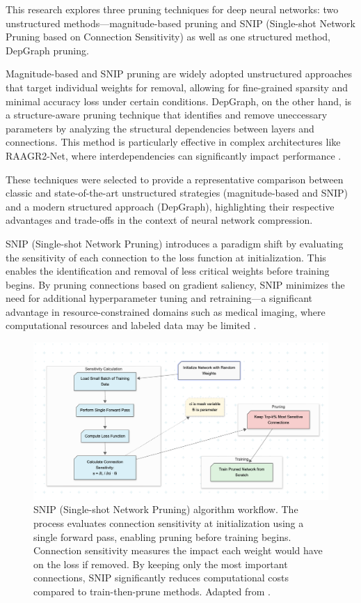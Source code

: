 \documentclass[12pt,a4paper]{article}
\begin{document}
This research explores three pruning techniques for deep neural networks: two unstructured methods—magnitude-based pruning and SNIP (Single-shot Network Pruning based on Connection Sensitivity) as well as one structured method, DepGraph pruning.

Magnitude-based and SNIP pruning are widely adopted unstructured approaches that target individual weights for removal, allowing for fine-grained sparsity and minimal accuracy loss under certain conditions. DepGraph, on the other hand, is a structure-aware pruning technique that identifies and remove uneccessary parameters by analyzing the structural dependencies between layers and connections. This method is particularly effective in complex architectures like RAAGR2-Net, where interdependencies can significantly impact performance \cite{ Cai2022Dependency}.

These techniques were selected to provide a representative comparison between classic and state-of-the-art unstructured strategies (magnitude-based and SNIP) and a modern structured approach (DepGraph), highlighting their respective advantages and trade-offs in the context of neural network compression.

SNIP (Single-shot Network Pruning) introduces a paradigm shift by evaluating the sensitivity of each connection to the loss function at initialization. This enables the identification and removal of less critical weights before training begins. By pruning connections based on gradient saliency, SNIP minimizes the need for additional hyperparameter tuning and retraining—a significant advantage in resource-constrained domains such as medical imaging, where computational resources and labeled data may be limited \cite{Lee2019SNIP, Liu2023Survey}.

\begin{figure}[H]
\centering
\includegraphics[width=\textwidth]{snip_workflow.png}
\caption{SNIP (Single-shot Network Pruning) algorithm workflow. The process evaluates connection sensitivity at initialization using a single forward pass, enabling pruning before training begins. Connection sensitivity measures the impact each weight would have on the loss if removed. By keeping only the most important connections, SNIP significantly reduces computational costs compared to train-then-prune methods. Adapted from \cite{Lee2019SNIP}.}
\label{fig:snip_workflow}
\end{figure}
\end{document}

